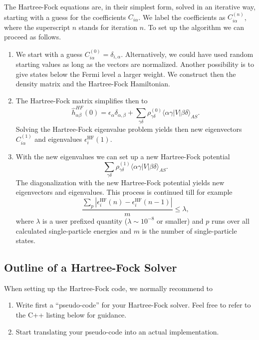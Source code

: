 \documentclass[11pt,a4wide]{article}
\begin{document}
The Hartree-Fock equations are, in their simplest form, solved in an
iterative way, starting with a guess for the coefficients
$C_{i\alpha}$. We label the coefficients as $C_{i\alpha}^{(n)}$, where
the superscript $n$ stands for iteration $n$.  To set up the algorithm
we can proceed as follows.
\begin{enumerate}
\item We start with a guess
  $C_{i\alpha}^{(0)}=\delta_{i,\alpha}$. Alternatively, we could have
  used random starting values as long as the vectors are
  normalized. Another possibility is to give states below the Fermi
  level a larger weight. We construct then the density matrix and the 
Hartree-Fock Hamiltonian. 
\item The Hartree-Fock matrix simplifies then to
\[
\hat{h}_{\alpha\beta}^{HF}(0)=\epsilon_{\alpha}\delta_{\alpha,\beta}+
\sum_{\gamma\delta} \rho_{\gamma\delta}^{(0)}\langle \alpha\gamma|V|\beta\delta\rangle_{AS}.
\]
Solving the Hartree-Fock eigenvalue problem yields then new eigenvectors $C_{i\alpha}^{(1)}$ and eigenvalues
$\epsilon_i^{\mathrm{HF}}(1)$. 
\item With the new eigenvalues we can set up a new Hartree-Fock potential 
\[
\sum_{\gamma\delta} \rho_{\gamma\delta}^{(1)}\langle \alpha\gamma|V|\beta\delta\rangle_{AS}.
\]
The diagonalization with the new Hartree-Fock potential yields new eigenvectors and eigenvalues.
This process is continued till for example
\[
\frac{\sum_{p} |\epsilon_i^{\mathrm{HF}}(n)-\epsilon_i^{\mathrm{HF}}(n-1)|}{m}\le \lambda,  
\]
where $\lambda$ is a user prefixed quantity ($\lambda \sim 10^{-8}$ or smaller) and $p$ runs over all calculated single-particle
energies and $m$ is the number of single-particle states.
\end{enumerate}



\subsection*{Outline of a Hartree-Fock Solver}
When setting up the Hartree-Fock code, we normally recommend to 
\begin{enumerate}
\item Write first a ``pseudo-code'' for your Hartree-Fock solver. Feel free to refer to the C++ listing below for guidance.  
\item Start translating your pseudo-code into an actual implementation. 
\end{enumerate}
\end{document}
